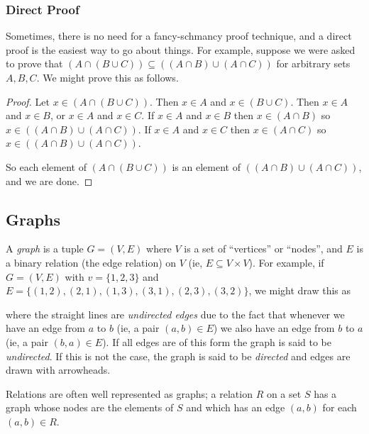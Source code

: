\documentclass[12pt]{article}
\begin{document}
\subsubsection*{Direct Proof} Sometimes, there is no need for a fancy-schmancy proof technique, and a direct proof is the easiest way to go about things. For example, suppose we were asked to prove that $(A \cap (B \cup C)) \subseteq ((A \cap B) \cup (A \cap C))$ for arbitrary sets $A, B, C$. We might prove this as follows. 

\begin{proof}
Let $x \in (A \cap (B \cup C))$. Then $x \in A$ and $x \in (B \cup C)$. Then $x \in A$ and $x \in B$, or $x \in A$ and $x \in C$. If $x \in A$ and $x \in B$ then $x \in (A \cap B)$ so $x \in ((A \cap B) \cup (A \cap C))$. If $x \in A$ and $x \in C$ then $x \in (A \cap C)$ so $x \in ((A \cap B) \cup (A \cap C))$. 

So each element of $(A \cap (B \cup C))$ is an element of $((A \cap B) \cup (A \cap C))$, and we are done. 
\end{proof}

\subsection{Graphs}
A \emph{graph} is a tuple $G = (V, E)$ where $V$ is a set of ``vertices'' or ``nodes'', and $E$ is a binary relation (the edge relation) on $V$ (ie, $E \subseteq V \times V$). For example, if $G = (V, E)$ with $v = \{1, 2, 3\}$ and $E = \{(1, 2), (2, 1), (1, 3), (3, 1), (2, 3), (3, 2)\}$, we might draw this as


where the straight lines are \emph{undirected edges} due to the fact that whenever we have an edge from $a$ to $b$ (ie, a pair $(a, b) \in E$) we also have an edge from $b$ to $a$ (ie, a pair $(b, a) \in E$). If all edges are of this form the graph is said to be \emph{undirected}. If this is not the case, the graph is said to be \emph{directed} and edges are drawn with arrowheads. 

Relations are often well represented as graphs; a relation $R$ on a set $S$ has a graph whose nodes are the elements of $S$ and which has an edge $(a, b)$ for each $(a, b) \in R$. 
\end{document}
